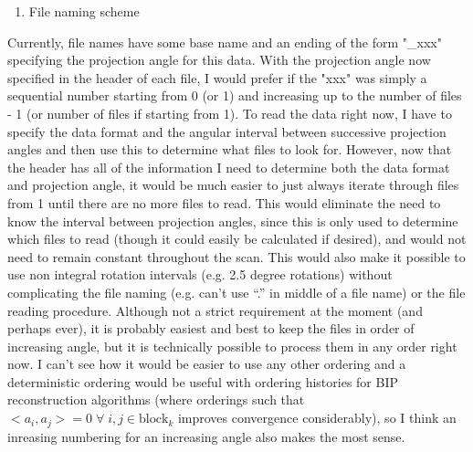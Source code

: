 \documentclass{article}
\begin{document}
\begin{enumerate}[label = (\arabic*), leftmargin = 0.0cm, resume = section]
\bfseries
\item File naming scheme
\end{enumerate}
Currently, file names have some base name and an ending of the form "\_xxx" specifying the projection angle for this data.  With the projection angle now specified in the header of each file, I would prefer if the "xxx" was simply a sequential number starting from 0 (or 1) and increasing up to the number of files - 1 (or number of files if starting from 1).  To read the data right now, I have to specify the data format and the angular interval between successive projection angles and then use this to determine what files to look for.  However, now that the header has all of the information I need to determine both the data format and projection angle, it would be much easier to just always iterate through files from 1 until there are no more files to read.  This would eliminate the need to know the interval between projection angles, since this is only used to determine which files to read (though it could easily be calculated if desired), and would not need to remain constant throughout the scan.  This would also make it possible to use non integral rotation intervals (e.g. 2.5 degree rotations) without complicating the file naming (e.g. can't use ``.'' in middle of a file name) or the file reading procedure.  Although not a strict requirement at the moment (and perhaps ever), it is probably easiest and best to keep the files in order of increasing angle, but it is technically possible to process them in any order right now.  I can't see how it would be easier to use any other ordering and a deterministic ordering would be useful with ordering histories for BIP reconstruction algorithms (where orderings such that $<a_i,a_j> = 0 \;\forall\; i,j \in \text{block}_k$ improves convergence considerably), so I think an inreasing numbering for an increasing angle also makes the most sense.
\end{document}
